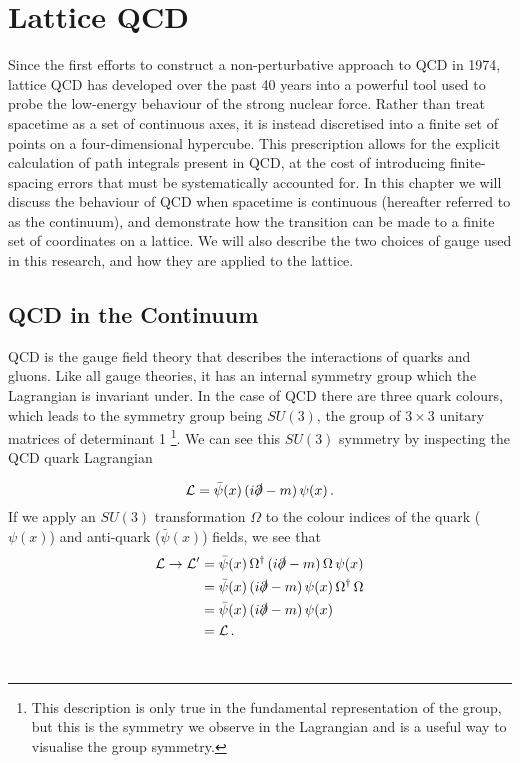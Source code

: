 
\chapter{Lattice QCD}

\ifpdf
    \graphicspath{{Chapter2/Figs/Raster/}{Chapter2/Figs/PDF/}{Chapter2/Figs/}}
\else
    \graphicspath{{Chapter2/Figs/Vector/}{Chapter2/Figs/}}
\fi
Since the first efforts to construct a non-perturbative approach to QCD in 1974\cite{Wilson:1974sk}, lattice QCD has developed over the past 40 years into a powerful tool used to probe the low-energy behaviour of the strong nuclear force. Rather than treat spacetime as a set of continuous axes, it is instead discretised into a finite set of points on a four-dimensional hypercube. This prescription allows for the explicit calculation of path integrals present in QCD, at the cost of introducing finite-spacing errors that must be systematically accounted for. In this chapter we will discuss the behaviour of QCD when spacetime is continuous (hereafter referred to as the continuum), and demonstrate how the transition can be made to a finite set of coordinates on a lattice. We will also describe the two choices of gauge used in this research, and how they are applied to the lattice. 

\section{QCD in the Continuum}
QCD is the gauge field theory that describes the interactions of quarks and gluons. Like all gauge theories, it has an internal symmetry group which the Lagrangian is invariant under. In the case of QCD there are three quark colours, which leads to the symmetry group being $SU(3)$, the group of $3\times 3$ unitary matrices of determinant 1 \footnote{This description is only true in the fundamental representation of the group, but this is the symmetry we observe in the Lagrangian and is a useful way to visualise the group symmetry.}. We can see this $SU(3)$ symmetry by inspecting the QCD quark Lagrangian

\begin{equation}
\mathcal{L} = \bar{\psi}(x)\,(i\slashed{\partial}-m)\,\psi(x)\,.
\label{GlobalQuarkLagrangian}
\end{equation}
If we apply an $SU(3)$ transformation $\Omega$ to the colour indices of the quark ($\psi (x)$) and anti-quark ($\bar{\psi} (x)$) fields, we see that
\begin{align*}
\mathcal{L}\rightarrow\mathcal{L'}&=\bar{\psi}(x)\,\Omega^\dag\,(i\slashed{\partial}-m)\,\Omega\,\psi(x)\\
&= \bar{\psi}(x)\,(i\slashed{\partial}-m)\,\psi(x)\,\Omega^\dag\,\Omega\\
&= \bar{\psi}(x)\,(i\slashed{\partial}-m)\,\psi(x)\\
&= \mathcal{L}\, .
\end{align*}\\

